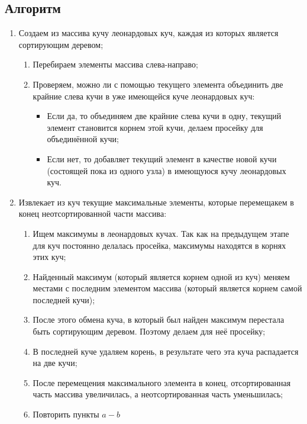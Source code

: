 	\subsection*{Алгоритм}

	\begin{enumerate} \label{alg:SmoothSort}

		\item Создаем из массива кучу леонардовых куч, каждая из которых является сортирующим деревом;

			\begin{enumerate}
			\item Перебираем элементы массива слева-направо;
			\item Проверяем, можно ли с помощью текущего элемента объединить две крайние слева кучи в уже имеющейся куче леонардовых куч:

				\begin{itemize}
					\item Если да, то объединяем две крайние слева кучи в одну, текущий элемент становится корнем этой кучи, делаем просейку для объединённой кучи;
					\item Если нет, то добавляет текущий элемент в качестве новой кучи (состоящей пока из одного узла) в имеющуюся кучу леонардовых куч.
				\end{itemize}

			\end{enumerate}

		\item Извлекает из куч текущие максимальные элементы, которые перемещакем в конец неотсортированной части массива:

			\begin{enumerate}
			\item Ищем максимумы в леонардовых кучах. Так как на предыдущем этапе для куч постоянно делалась просейка, максимумы находятся в корнях этих куч;
			\item Найденный максимум (который является корнем одной из куч) меняем местами с последним элементом массива (который является корнем самой последней кучи);
			\item После этого обмена куча, в который был найден максимум перестала быть сортирующим деревом. Поэтому делаем для неё просейку;
			\item В последней куче удаляем корень, в результате чего эта куча распадается на две кучи;
			\item После перемещения максимального элемента в конец, отсортированная часть массива увеличилась, а неотсортированная часть уменьшилась;
			\item Повторить пункты \begin{math}a-b\end{math}
			\end{enumerate}

	\end{enumerate}

